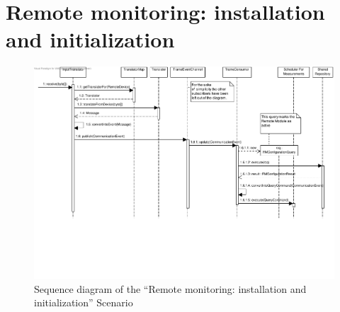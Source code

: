 \section{Remote monitoring: installation and initialization}
\label{scenario:rm-installation}

\begin{figure}[H]
	\begin{centering}
		\includegraphics[width=\textwidth]{figs/scenario-5-3-1.pdf}
		\caption{Sequence diagram of the ``Remote monitoring: installation and
		initialization'' Scenario}
		\label{fig:scenario-5-3-1}
	\end{centering}
\end{figure}